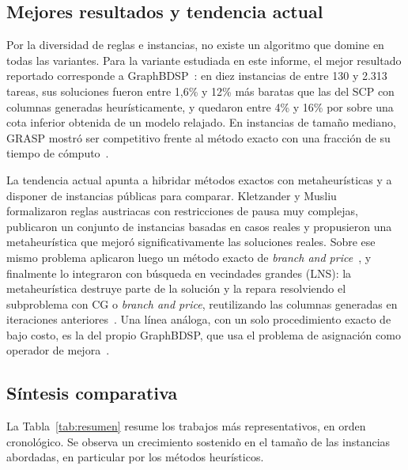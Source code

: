 \documentclass[letter, 10pt]{article}
\begin{document}
\subsection{Mejores resultados y tendencia actual}
Por la diversidad de reglas e instancias, no existe un algoritmo que domine en todas las variantes. Para la variante estudiada en este informe, el mejor resultado reportado corresponde a GraphBDSP~\cite{Constantino2017}: en diez instancias de entre 130 y 2.313 tareas, sus soluciones fueron entre 1,6\% y 12\% más baratas que las del SCP con columnas generadas heurísticamente, y quedaron entre 4\% y 16\% por sobre una cota inferior obtenida de un modelo relajado. En instancias de tamaño mediano, GRASP mostró ser competitivo frente al método exacto con una fracción de su tiempo de cómputo~\cite{DeLeone2011a}.

La tendencia actual apunta a hibridar métodos exactos con metaheurísticas y a disponer de instancias públicas para comparar. Kletzander y Musliu~\cite{Kletzander2020} formalizaron reglas austriacas con restricciones de pausa muy complejas, publicaron un conjunto de instancias basadas en casos reales y propusieron una metaheurística que mejoró significativamente las soluciones reales. Sobre ese mismo problema aplicaron luego un método exacto de \emph{branch and price}~\cite{Kletzander2021}, y finalmente lo integraron con búsqueda en vecindades grandes (LNS): la metaheurística destruye parte de la solución y la repara resolviendo el subproblema con CG o \emph{branch and price}, reutilizando las columnas generadas en iteraciones anteriores~\cite{Kletzander2026}. Una línea análoga, con un solo procedimiento exacto de bajo costo, es la del propio GraphBDSP, que usa el problema de asignación como operador de mejora~\cite{Constantino2017}.

\subsection{Síntesis comparativa}
La Tabla~\ref{tab:resumen} resume los trabajos más representativos, en orden cronológico. Se observa un crecimiento sostenido en el tamaño de las instancias abordadas, en particular por los métodos heurísticos.
\end{document}
